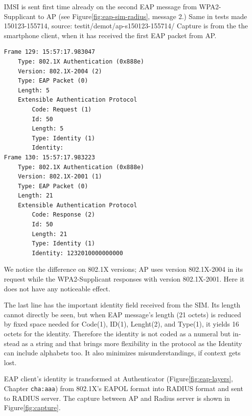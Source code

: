\documentclass[12pt,a4paper,english]{tutthesis}
\begin{document}
\begin{otherlanguage}{english}
IMSI is sent first time already on the second EAP message from 
WPA2-Supplicant to AP (see Figure\ref{fig:eap-sim-radius}, message 2.)
Same in tests made 150123-155714, source:
testit/demot/ap-s150123-155714/
Capture is from the the smartphone client, when it has received the first EAP
packet from AP.

\scriptsize
\begin{verbatim}
Frame 129: 15:57:17.983047
    Type: 802.1X Authentication (0x888e)
    Version: 802.1X-2004 (2)
    Type: EAP Packet (0)
    Length: 5
    Extensible Authentication Protocol
        Code: Request (1)
        Id: 50
        Length: 5
        Type: Identity (1)
        Identity: 
Frame 130: 15:57:17.983223
    Type: 802.1X Authentication (0x888e)
    Version: 802.1X-2001 (1)
    Type: EAP Packet (0)
    Length: 21
    Extensible Authentication Protocol
        Code: Response (2)
        Id: 50
        Length: 21
        Type: Identity (1)
        Identity: 1232010000000000
\end{verbatim}
\normalsize

We notice the difference on 802.1X versions; AP uses version
802.1X-2004 in its request while the WPA2-Supplicant
responses with version 802.1X-2001. Here it does not have any
noticeable effect. 

The last line has the important identity field received from the SIM.
Its length cannot directly be seen, but when EAP message's length (21
octets) is reduced by fixed space needed for Code(1), ID(1),
Lenght(2), and Type(1), it yields 16 octets for the
identity. Therefore the identity is not coded as a 
numeral but instead as a string and that brings more flexibility in
the protocol as the Identity can include alphabets too. It also
minimizes misunderstandings, if context gets lost.





EAP client's identity is transformed at Authenticator
(Figure\ref{fig:eap-layers}, Chapter \texttt{cha:aaa}) from 802.1X's 
EAPOL format  into RADIUS format and
sent to RADIUS server. The capture between AP and Radius server is
shown
in Figure\ref{fig:capture}.



\end{otherlanguage}
\end{document}
